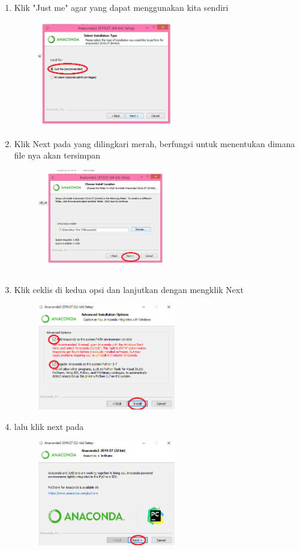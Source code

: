 \begin{enumerate}
	\item Klik "Just me" agar yang dapat menggunakan kita sendiri
	\begin{figure} [h]
	\includegraphics[width=6cm]{python/5.png}
	\centering
	\end{figure}
	
	\item Klik Next pada yang dilingkari merah, berfungsi untuk menentukan dimana file nya akan tersimpan 
	\begin{figure} [h]
	\includegraphics[width=6cm]{python/6.png}
	\centering
	\end{figure}
	
	\item Klik ceklis di kedua opsi dan lanjutkan dengan mengklik Next  
	\begin{figure} [h]
	\includegraphics[width=6cm]{python/7.png}
	\centering
	\end{figure}
	
	\item lalu klik next pada 
	\begin{figure} [h]
	\includegraphics[width=6cm]{python/9.png}
	\centering
	\end{figure}
	

\end{enumerate}
